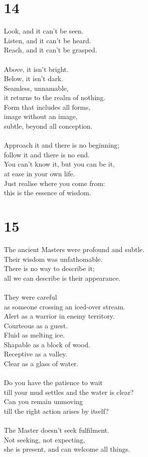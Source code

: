 \documentclass[b5paper, 12pt, oneside]{book}
\begin{document}
\chapter*{14}
Look, and it can't be seen.\\
Listen, and it can't be heard.\\
Reach, and it can't be grasped.\\
\\
Above, it isn't bright.\\
Below, it isn't dark.\\
Seamless, unnamable,\\
it returns to the realm of nothing.\\
Form that includes all forms,\\
image without an image,\\
subtle, beyond all conception.\\
\\
Approach it and there is no beginning;\\
follow it and there is no end.\\
You can't know it, but you can be it,\\
at ease in your own life.\\
Just realise where you come from:\\
this is the essence of wisdom.\\

\chapter*{15}
The ancient Masters were profound and subtle.\\
Their wisdom was unfathomable.\\
There is no way to describe it;\\
all we can describe is their appearance.\\
\\
They were careful\\
as someone crossing an iced-over stream.\\
Alert as a warrior in enemy territory.\\
Courteous as a guest.\\
Fluid as melting ice.\\
Shapable as a block of wood.\\
Receptive as a valley.\\
Clear as a glass of water.\\
\\
Do you have the patience to wait\\
till your mud settles and the water is clear?\\
Can you remain unmoving\\
till the right action arises by itself?\\
\\
The Master doesn't seek fulfilment.\\
Not seeking, not expecting,\\
she is present, and can welcome all things.
\end{document}
